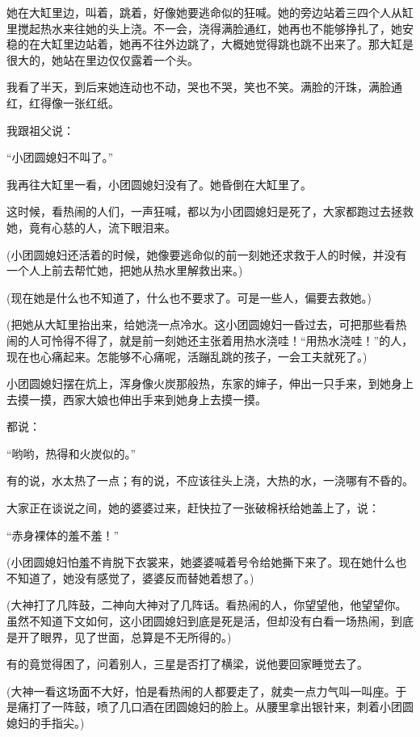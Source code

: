 \par 她在大缸里边，叫着，跳着，好像她要逃命似的狂喊。她的旁边站着三四个人从缸里搅起热水来往她的头上浇。不一会，浇得满脸通红，她再也不能够挣扎了，她安稳的在大缸里边站着，她再不往外边跳了，大概她觉得跳也跳不出来了。那大缸是很大的，她站在里边仅仅露着一个头。
\par 我看了半天，到后来她连动也不动，哭也不哭，笑也不笑。满脸的汗珠，满脸通红，红得像一张红纸。
\par 我跟祖父说：
\par “小团圆媳妇不叫了。”
\par 我再往大缸里一看，小团圆媳妇没有了。她昏倒在大缸里了。
\par 这时候，看热闹的人们，一声狂喊，都以为小团圆媳妇是死了，大家都跑过去拯救她，竟有心慈的人，流下眼泪来。
\par (小团圆媳妇还活着的时候，她像要逃命似的前一刻她还求救于人的时候，并没有一个人上前去帮忙她，把她从热水里解救出来。)
\par (现在她是什么也不知道了，什么也不要求了。可是一些人，偏要去救她。)
\par (把她从大缸里抬出来，给她浇一点冷水。这小团圆媳妇一昏过去，可把那些看热闹的人可怜得不得了，就是前一刻她还主张着用热水浇哇！“用热水浇哇！”的人，现在也心痛起来。怎能够不心痛呢，活蹦乱跳的孩子，一会工夫就死了。)
\par 小团圆媳妇摆在炕上，浑身像火炭那般热，东家的婶子，伸出一只手来，到她身上去摸一摸，西家大娘也伸出手来到她身上去摸一摸。
\par 都说：
\par “哟哟，热得和火炭似的。”
\par 有的说，水太热了一点；有的说，不应该往头上浇，大热的水，一浇哪有不昏的。
\par 大家正在谈说之间，她的婆婆过来，赶快拉了一张破棉袄给她盖上了，说：
\par “赤身裸体的羞不羞！”
\par (小团圆媳妇怕羞不肯脱下衣裳来，她婆婆喊着号令给她撕下来了。现在她什么也不知道了，她没有感觉了，婆婆反而替她着想了。)
\par (大神打了几阵鼓，二神向大神对了几阵话。看热闹的人，你望望他，他望望你。虽然不知道下文如何，这小团圆媳妇到底是死是活，但却没有白看一场热闹，到底是开了眼界，见了世面，总算是不无所得的。)
\par 有的竟觉得困了，问着别人，三星是否打了横梁，说他要回家睡觉去了。
\par (大神一看这场面不大好，怕是看热闹的人都要走了，就卖一点力气叫一叫座。于是痛打了一阵鼓，喷了几口酒在团圆媳妇的脸上。从腰里拿出银针来，刺着小团圆媳妇的手指尖。)

